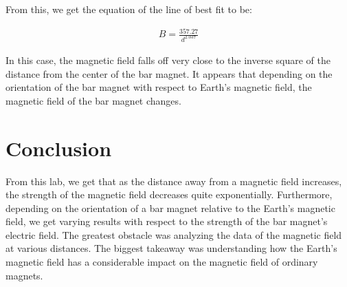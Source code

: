 \documentclass[12pt]{article}
\begin{document}
From this, we get the equation of the line of best fit to be:

\begin{equation*}
    \begin{split}
        B = \frac{357.27}{d^{2.037}}
    \end{split}
\end{equation*}

In this case, the magnetic field falls off very close to the inverse square of the distance from the center of the bar magnet. It appears that depending on the orientation of the bar magnet with respect to Earth's magnetic field, the magnetic field of the bar magnet changes.

\section{Conclusion}
From this lab, we get that as the distance away from a magnetic field increases, the strength of the magnetic field decreases quite exponentially. Furthermore, depending on the orientation of a bar magnet relative to the Earth's magnetic field, we get varying results with respect to the strength of the bar magnet's electric field. The greatest obstacle was analyzing the data of the magnetic field at various distances. The biggest takeaway was understanding how the Earth's magnetic field has a considerable impact on the magnetic field of ordinary magnets.
\end{document}
